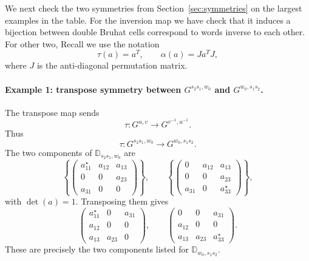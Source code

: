 \documentclass[12pt]{amsart}
\newcommand{\D}{\mathbb D}
\theoremstyle{plain}
\theoremstyle{definition}
\theoremstyle{remark}
\begin{document}
We next check the two symmetries from Section~\ref{sec:symmetries} on the
largest examples in the table. For the inversion map we have check that it induces a bijection between double Bruhat cells correspond to words inverse to each other. For other two, Recall we use the notation
\begin{equation*}
   \tau(a)=a^T,
   \qquad
   \alpha(a)=Ja^TJ,
\end{equation*}
where $J$ is the anti-diagonal permutation matrix.

\paragraph{\bf Example 1: transpose symmetry between $G^{s_2s_1,w_0}$ and
$G^{w_0,s_1s_2}$.}
The transpose map sends
\begin{equation*}
   \tau:G^{u,v}\longrightarrow G^{v^{-1},u^{-1}}.
\end{equation*}
Thus
\begin{equation*}
   \tau:G^{s_2s_1,w_0}\longrightarrow G^{w_0,s_1s_2}.
\end{equation*}
The two components of $\D_{s_2s_1,w_0}$ are
\begin{equation*}
\left\{
\begin{pmatrix}
a_{11}^{\star}&a_{12}&a_{13}\\
0&0&a_{23}\\
a_{31}&0&0
\end{pmatrix}
\right\},
\qquad
\left\{
\begin{pmatrix}
0&a_{12}&a_{13}\\
0&0&a_{23}\\
a_{31}&0&a_{33}^{\star}
\end{pmatrix}
\right\},
\end{equation*}
with $\det(a)=1$. Transposing them gives
\begin{equation*}
\begin{pmatrix}
a_{11}^{\star}&0&a_{31}\\
a_{12}&0&0\\
a_{13}&a_{23}&0
\end{pmatrix},
\qquad
\begin{pmatrix}
0&0&a_{31}\\
a_{12}&0&0\\
a_{13}&a_{23}&a_{33}^{\star}
\end{pmatrix}.
\end{equation*}
These are precisely the two components listed
for $\D_{w_0,s_1s_2}$.
\end{document}
